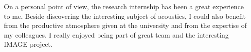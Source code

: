 \documentclass[11pt]{report} %
\begin{document}
On a personal point of view, the research internship has been a great experience to me.
Beside discovering the interesting subject of acoustics, I could also benefit from the productive atmosphere given at the university and from the expertise of my colleagues. 
I really enjoyed being part of great team and the interesting IMAGE project. 
  
%


\printbibliography
\end{document}
